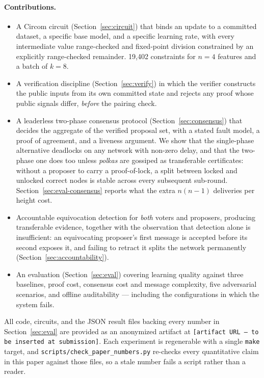 \documentclass{llncs}
\begin{document}
\paragraph{Contributions.}
\begin{itemize}
  \item A Circom circuit (Section~\ref{sec:circuit}) that binds an update to a
    committed dataset, a specific base model, and a specific learning rate, with
    every intermediate value range-checked and fixed-point division constrained
    by an explicitly range-checked remainder. 19{,}402 constraints for
    $n=4$ features and a batch of $k=8$.
  \item A verification discipline (Section~\ref{sec:verify}) in which the
    verifier constructs the public inputs from its own committed state and
    rejects any proof whose public signals differ, \emph{before} the pairing
    check.
  \item A leaderless two-phase consensus protocol (Section~\ref{sec:consensus})
    that decides the aggregate of the verified proposal set, with a stated fault
    model, a proof of agreement, and a liveness argument. We show that the
    single-phase alternative deadlocks on any network with non-zero delay, and
    that the two-phase one does too unless \emph{polkas} are gossiped as
    transferable certificates: without a proposer to carry a proof-of-lock, a
    split between locked and unlocked correct nodes is stable across every
    subsequent sub-round. Section~\ref{sec:eval-consensus} reports what the
    extra $n(n-1)$ deliveries per height cost.
  \item Accountable equivocation detection for \emph{both} voters and proposers,
    producing transferable evidence, together with the observation that
    detection alone is insufficient: an equivocating proposer's first message is
    accepted before its second exposes it, and failing to retract it splits the
    network permanently (Section~\ref{sec:accountability}).
  \item An evaluation (Section~\ref{sec:eval}) covering learning quality against
    three baselines, proof cost, consensus cost and message complexity, five
    adversarial scenarios, and offline auditability --- including the
    configurations in which the system fails.
\end{itemize}

All code, circuits, and the JSON result files backing every number in
Section~\ref{sec:eval} are provided as an anonymized artifact at
\texttt{[artifact URL --- to be inserted at submission]}. Each experiment is
regenerable with a single \texttt{make} target, and
\texttt{scripts/check\_paper\_numbers.py} re-checks every quantitative claim in
this paper against those files, so a stale number fails a script rather than a
reader.
\end{document}

